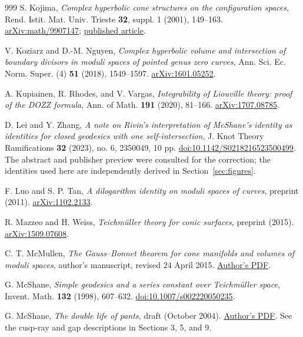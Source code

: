 \documentclass[11pt,a4paper]{article}
\numberwithin{equation}{section}
\theoremstyle{definition}
\theoremstyle{remark}
\begin{document}
\begin{thebibliography}{999}
S. Kojima,
\emph{Complex hyperbolic cone structures on the configuration spaces},
Rend. Istit. Mat. Univ. Trieste \textbf{32}, suppl. 1 (2001), 149--163.
\href{https://arxiv.org/abs/math/9907147}{arXiv:math/9907147};
\href{https://rendiconti.dmi.units.it/volumi/32s1/09.pdf}{published article}.

V. Koziarz and D.-M. Nguyen,
\emph{Complex hyperbolic volume and intersection of boundary divisors in
moduli spaces of pointed genus zero curves},
Ann. Sci. Ec. Norm. Super. (4) \textbf{51} (2018), 1549--1597.
\href{https://arxiv.org/abs/1601.05252}{arXiv:1601.05252}.

A. Kupiainen, R. Rhodes, and V. Vargas,
\emph{Integrability of Liouville theory: proof of the DOZZ formula},
Ann. of Math. \textbf{191} (2020), 81--166.
\href{https://arxiv.org/abs/1707.08785}{arXiv:1707.08785}.

D. Lei and Y. Zhang,
\emph{A note on Rivin's interpretation of McShane's identity as identities
for closed geodesics with one self-intersection},
J. Knot Theory Ramifications \textbf{32} (2023), no. 6, 2350049, 10 pp.
\href{https://doi.org/10.1142/S0218216523500499}{doi:10.1142/S0218216523500499}.
The abstract and publisher preview were consulted for the correction;
the identities used here are independently derived in Section~\ref{sec:figures}.

F. Luo and S. P. Tan,
\emph{A dilogarithm identity on moduli spaces of curves},
preprint (2011).
\href{https://arxiv.org/abs/1102.2133}{arXiv:1102.2133}.

R. Mazzeo and H. Weiss,
\emph{Teichm\"uller theory for conic surfaces}, preprint (2015).
\href{https://arxiv.org/abs/1509.07608}{arXiv:1509.07608}.

C. T. McMullen,
\emph{The Gauss--Bonnet theorem for cone manifolds and volumes of moduli spaces},
author's manuscript, revised 24 April 2015.
\href{https://people.math.harvard.edu/~ctm/papers/home/text/papers/gb/gb.pdf}{Author's PDF}.

G. McShane,
\emph{Simple geodesics and a series constant over Teichm\"uller space},
Invent. Math. \textbf{132} (1998), 607--632.
\href{https://doi.org/10.1007/s002220050235}{doi:10.1007/s002220050235}.

G. McShane,
\emph{The double life of pants}, draft (October 2004).
\href{https://macbuse.github.io/M2R_2019/shearsAgain.pdf}{Author's PDF}.
See the cusp-ray and gap descriptions in Sections 3, 5, and 9.


\end{thebibliography}
\end{document}
